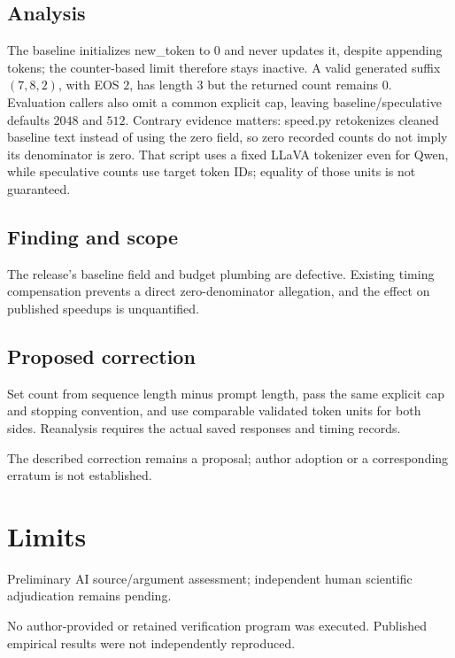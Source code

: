 \documentclass[11pt]{article}
\begin{document}
\subsection*{Analysis}

The baseline initializes new\_token to \(0\) and never updates it, despite appending tokens; the counter-based limit therefore stays inactive. A valid generated suffix \((7,8,2)\), with EOS \(2\), has length \(3\) but the returned count remains \(0\). Evaluation callers also omit a common explicit cap, leaving baseline/speculative defaults \(2048\) and \(512\). Contrary evidence matters: speed.py retokenizes cleaned baseline text instead of using the zero field, so zero recorded counts do not imply its denominator is zero. That script uses a fixed LLaVA tokenizer even for Qwen, while speculative counts use target token IDs; equality of those units is not guaranteed.

\subsection*{Finding and scope}

The release’s baseline field and budget plumbing are defective. Existing timing compensation prevents a direct zero-denominator allegation, and the effect on published speedups is unquantified.

\subsection*{Proposed correction}

Set count from sequence length minus prompt length, pass the same explicit cap and stopping convention, and use comparable validated token units for both sides. Reanalysis requires the actual saved responses and timing records.

The described correction remains a proposal; author adoption or a corresponding erratum is not established.

\section*{Limits}

Preliminary AI source/argument assessment; independent human scientific adjudication remains pending.\par

No author-provided or retained verification program was executed. Published empirical results were not independently reproduced.\par
\end{document}
